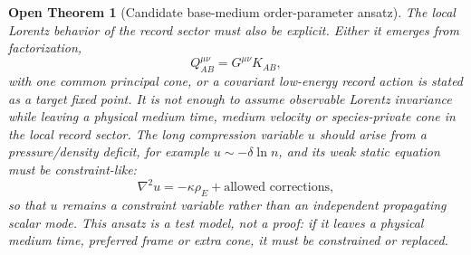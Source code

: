 \documentclass[11pt]{article}
\newtheorem{openthm}{Open Theorem}
\begin{document}
\begin{openthm}[Candidate base-medium order-parameter ansatz]
The local Lorentz behavior of the record sector must also be explicit.  Either
it emerges from factorization,
\[
\boxed{
Q_{AB}^{\mu\nu}=G^{\mu\nu}K_{AB},
}
\]
with one common principal cone, or a covariant low-energy record action is
stated as a target fixed point.  It is not enough to assume observable Lorentz
invariance while leaving a physical medium time, medium velocity or
species-private cone in the local record sector.
The long compression variable \(u\) should arise from a pressure/density
deficit, for example \(u\sim-\delta\ln n\), and its weak static equation must be
constraint-like:
\[
\boxed{
\nabla^2u=-\kappa\rho_E+\text{allowed corrections},
}
\]
so that \(u\) remains a constraint variable rather than an independent
propagating scalar mode.  This ansatz is a test model, not a proof:
if it leaves a physical medium time, preferred frame or extra cone, it must be
constrained or replaced.
\end{openthm}
\end{document}
